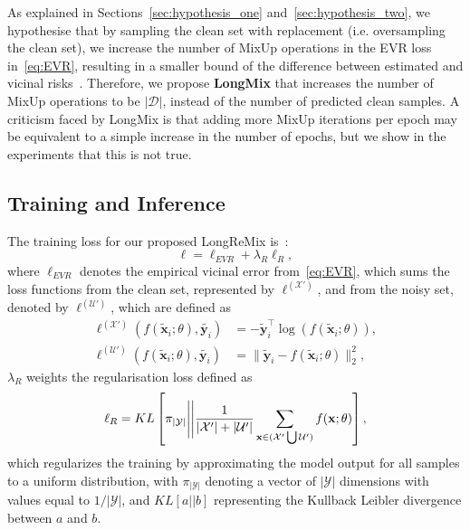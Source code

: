 \documentclass[review]{elsarticle}
\begin{document}
As explained in Sections~\ref{sec:hypothesis_one} and~\ref{sec:hypothesis_two},
we hypothesise that by sampling the clean set with replacement (i.e. oversampling the clean set), we increase the number of MixUp operations in the EVR loss in~\eqref{eq:EVR}, resulting in a smaller bound of the difference between estimated and vicinal risks~\cite{zhang2018generalization}.  
Therefore, we propose \textbf{LongMix} that increases the number of MixUp operations to be $|\mathcal{D}|$, instead of the number of predicted clean samples. 
A criticism faced by LongMix is that adding more MixUp iterations per epoch may be equivalent to a simple increase in the number of epochs, but we show in the experiments that this is not true.


\subsection{Training and Inference}



The training loss for our proposed LongReMix is~\cite{li2020dividemix}:
\begin{equation}
    \ell = \ell_{EVR} + \lambda_{R}\ell_{R},
    \label{eq:D_loss_full}
\end{equation}
where $\ell_{EVR}$ denotes the empirical vicinal error from~\eqref{eq:EVR}, which sums the loss functions from the clean set, represented by $\ell^{(\mathcal{X}')}$, and from the noisy set, denoted by $\ell^{(\mathcal{U}')}$, which are defined as
\begin{equation}
    \begin{split}
        \ell^{(\mathcal{X}')}(f(\tilde{\mathbf{x}}_i;\theta),\tilde{\mathbf{y}_i}) & =-\tilde{\mathbf{y}}_i^{\top}\log(f(\tilde{\mathbf{x}}_i;\theta)), \\ \ell^{(\mathcal{U}')}(f(\tilde{\mathbf{x}}_i;\theta),\tilde{\mathbf{y}_i}) & = \| \tilde{\mathbf{y}}_i - f(\tilde{\mathbf{x}}_i;\theta) \|^2_2,
    \end{split}
    \label{eq:clean_noisy_loss_functions}
\end{equation}
$\lambda_{R}$ weights the regularisation loss defined as
\begin{equation}
\small
    \ell_{R} =
    KL \left [ \pi_{|\mathcal{Y}|} \Bigg | \Bigg | \frac{1}{|\mathcal{X}'| + |\mathcal{U}'|} \sum_{\mathbf{x} \in (\mathcal{X}' \bigcup \mathcal{U}')} f(\mathbf{x};\theta) \right ],
    \label{eq:L_reg}
\end{equation}
which regularizes the training by approximating the model output for all samples to a uniform distribution, with $\pi_{|\mathcal{Y}|}$ denoting a vector of $|\mathcal{Y}|$ dimensions with values equal to $1/|\mathcal{Y}|$, and 
$KL[a||b]$ representing the Kullback Leibler divergence between $a$ and $b$.
\end{document}
